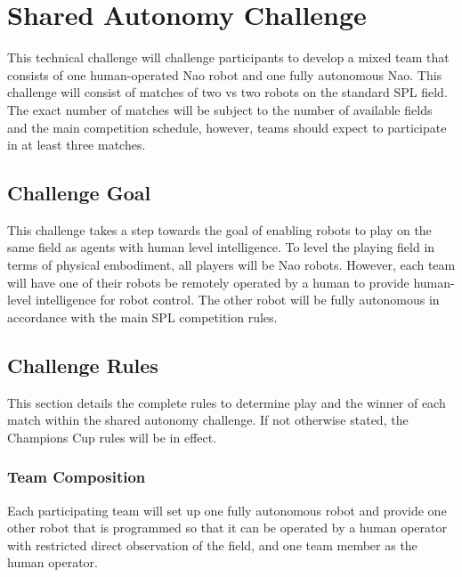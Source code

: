 \section{Shared Autonomy Challenge}

This technical challenge will challenge participants to develop a mixed team that consists of one human-operated Nao robot and one fully autonomous Nao. This challenge will consist of matches of two vs two robots on the standard SPL field. The exact number of matches will be subject to the number of available fields and the main competition schedule, however, teams should expect to participate in at least three matches.

\subsection{Challenge Goal}

This challenge takes a step towards the goal of enabling robots to play on the same field as agents with human level intelligence. To level the playing field in terms of physical embodiment, all players will be Nao robots. However, each team will have one of their robots be remotely operated by a human to provide human-level intelligence for robot control. The other robot will be fully autonomous in accordance with the main SPL competition rules.

\subsection{Challenge Rules}

This section details the complete rules to determine play and the winner of each match within the shared autonomy challenge. If not otherwise stated, the Champions Cup rules will be in effect.

\subsubsection{Team Composition}
Each participating team will set up one fully autonomous robot and provide one other robot that is programmed so that it can be operated by a human operator with restricted direct observation of the field, and one team member as the human operator.

